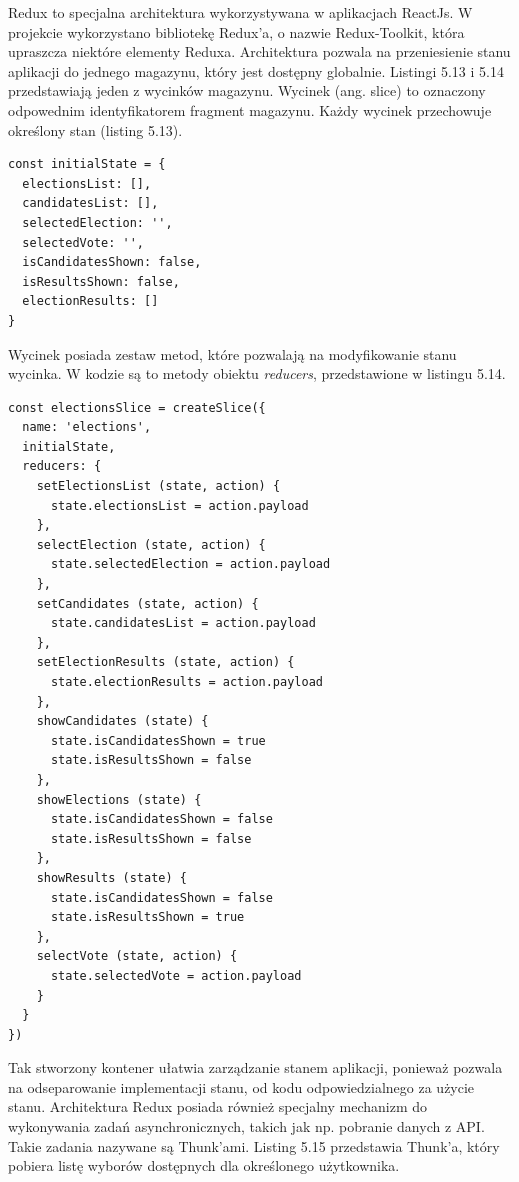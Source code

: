 \documentclass[a4paper,12pt]{book}
\begin{document}
Redux to specjalna architektura wykorzystywana w aplikacjach ReactJs. W projekcie wykorzystano bibliotekę Redux'a, o nazwie Redux-Toolkit, która upraszcza niektóre elementy Reduxa. Architektura pozwala na przeniesienie stanu aplikacji do jednego magazynu, który jest dostępny globalnie. Listingi 5.13 i  5.14 przedstawiają jeden z wycinków magazynu. Wycinek (ang. slice) to oznaczony odpowednim identyfikatorem fragment magazynu. Każdy wycinek przechowuje określony stan (listing 5.13).

\begin{lstlisting}[style=ES6, caption={Stan początkowy wycinka \textit{electionsSlice}.}]
const initialState = {
  electionsList: [],
  candidatesList: [],
  selectedElection: '',
  selectedVote: '',
  isCandidatesShown: false,
  isResultsShown: false,
  electionResults: []
}
\end{lstlisting}

Wycinek posiada zestaw metod, które pozwalają na modyfikowanie stanu wycinka. W kodzie są to metody obiektu \textit{reducers}, przedstawione w listingu 5.14.

\begin{lstlisting}[style=ES6, caption={Wycinek \textit{electionsSlice}.}]
const electionsSlice = createSlice({
  name: 'elections',
  initialState,
  reducers: {
    setElectionsList (state, action) {
      state.electionsList = action.payload
    },
    selectElection (state, action) {
      state.selectedElection = action.payload
    },
    setCandidates (state, action) {
      state.candidatesList = action.payload
    },
    setElectionResults (state, action) {
      state.electionResults = action.payload
    },
    showCandidates (state) {
      state.isCandidatesShown = true
      state.isResultsShown = false
    },
    showElections (state) {
      state.isCandidatesShown = false
      state.isResultsShown = false
    },
    showResults (state) {
      state.isCandidatesShown = false
      state.isResultsShown = true
    },
    selectVote (state, action) {
      state.selectedVote = action.payload
    }
  }
})
\end{lstlisting}

Tak stworzony kontener ułatwia zarządzanie stanem aplikacji, ponieważ pozwala na odseparowanie implementacji stanu, od kodu odpowiedzialnego za użycie stanu. Architektura Redux posiada również specjalny mechanizm do wykonywania zadań asynchronicznych, takich jak np. pobranie danych z API. Takie zadania nazywane są Thunk'ami. Listing 5.15 przedstawia Thunk'a, który pobiera listę wyborów dostępnych dla określonego użytkownika.
\end{document}
